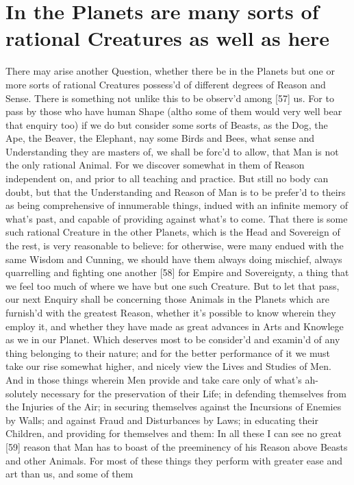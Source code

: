 \documentclass[letterpaper]{book}
\begin{document}
\section{In the Planets are many sorts of rational Creatures as well as here}

There may arise another Question, whether there be in the Planets but one or
more sorts of rational Creatures possess'd of different degrees of Reason
and Sense. There is something not unlike this to be observ'd among [57] us.
For to pass by those who have human Shape (altho some of them would very
well bear that enquiry too) if we do but consider some sorts of Beasts, as
the Dog, the Ape, the Beaver, the Elephant, nay some Birds and Bees, what
sense and Understanding they are masters of, we shall be forc'd to allow,
that Man is not the only rational Animal. For we discover somewhat in them
of Reason independent on, and prior to all teaching and practice.  But still
no body can doubt, but that the Understanding and Reason of Man is to be
prefer'd to theirs as being comprehensive of innumerable things, indued with
an infinite memory of what's past, and capable of providing against what's
to come. That there is some such rational Creature in the other Planets,
which is the Head and Sovereign of the rest, is very reasonable to believe:
for otherwise, were many endued with the same Wisdom and Cunning, we should
have them always doing mischief, always quarrelling and fighting one another
[58] for Empire and Sovereignty, a thing that we feel too much of where we
have but one such Creature. But to let that pass, our next Enquiry shall be
concerning those Animals in the Planets which are furnish'd with the
greatest Reason, whether it's possible to know wherein they employ it, and
whether they have made as great advances in Arts and Knowlege as we in our
Planet. Which deserves most to be consider'd and examin'd of any thing
belonging to their nature; and for the better performance of it we must take
our rise somewhat higher, and nicely view the Lives and Studies of Men.  And
in those things wherein Men provide and take care only of what's ah-
solutely necessary for the preservation of their Life; in defending
themselves from the Injuries of the Air; in securing themselves against the
Incursions of Enemies by Walls; and against Fraud and Disturbances by Laws;
in educating their Children, and providing for themselves and them: In all
these I can see no great [59] reason that Man has to boast of the
preeminency of his Reason above Beasts and other Animals. For most of these
things they perform with greater ease and art than us, and some of them
\end{document}
